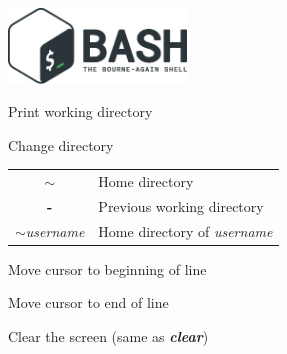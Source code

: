 \documentclass[12pt, a4paper]
{article}
\begin{document}
\pagestyle{empty}

\begin{center}
	 \hspace{1em}  \includegraphics[height=2cm]{bash_the_bourne_again_shell}
\end{center}

\begin{multicols}{3}


\begin{description}[nolistsep]
	\item[pwd] Print working directory
	\item[cd] Change directory 
	\item
	\begin{tabular}{cl}
		{\large \ttfamily \textbf{$\sim$}} & Home directory \\
		{\large \ttfamily \textbf{-}} & Previous working directory \\
		{\large \ttfamily \textbf{$\sim$}\textit{username}} & Home directory of \textit{username}
	\end{tabular}
	\item[ctrl-A] Move cursor to beginning of line
	\item[ctrl-E] Move cursor to end of line
	\item[ctrl-L] Clear the screen (same as \textbf{\textit{clear}})
\end{description}



\end{multicols}
\end{document}
